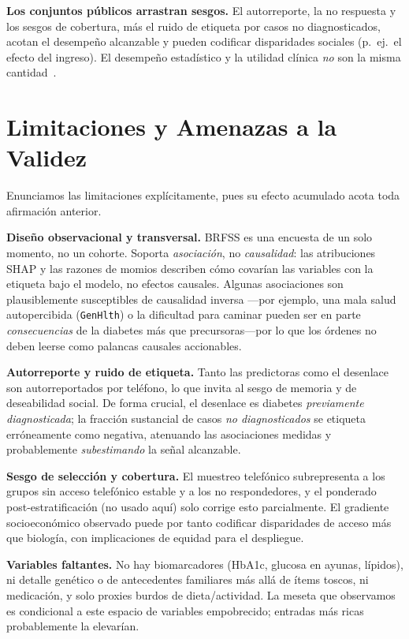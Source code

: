 \documentclass[conference]{IEEEtran}
\begin{document}
\textbf{Los conjuntos públicos arrastran sesgos.} El autorreporte, la no respuesta y los
sesgos de cobertura, más el ruido de etiqueta por casos no diagnosticados, acotan el
desempeño alcanzable y pueden codificar disparidades sociales (p.\ ej.\ el efecto del
ingreso). El desempeño estadístico y la utilidad clínica \emph{no} son la misma
cantidad~\cite{vancalster2019calibration,steyerberg2019validation}.

\section{Limitaciones y Amenazas a la Validez}
Enunciamos las limitaciones explícitamente, pues su efecto acumulado acota toda afirmación
anterior.

\textbf{Diseño observacional y transversal.} BRFSS es una encuesta de un solo momento, no un
cohorte. Soporta \emph{asociación}, no \emph{causalidad}: las atribuciones SHAP y las
razones de momios describen cómo covarían las variables con la etiqueta bajo el modelo, no
efectos causales. Algunas asociaciones son plausiblemente susceptibles de causalidad inversa
---por ejemplo, una mala salud autopercibida (\texttt{GenHlth}) o la dificultad para caminar
pueden ser en parte \emph{consecuencias} de la diabetes más que precursoras---por lo que los
órdenes no deben leerse como palancas causales accionables.

\textbf{Autorreporte y ruido de etiqueta.} Tanto las predictoras como el desenlace son
autorreportados por teléfono, lo que invita al sesgo de memoria y de deseabilidad social. De
forma crucial, el desenlace es diabetes \emph{previamente diagnosticada}; la fracción
sustancial de casos \emph{no diagnosticados} se etiqueta erróneamente como negativa,
atenuando las asociaciones medidas y probablemente \emph{subestimando} la señal alcanzable.

\textbf{Sesgo de selección y cobertura.} El muestreo telefónico subrepresenta a los grupos
sin acceso telefónico estable y a los no respondedores, y el ponderado post-estratificación
(no usado aquí) solo corrige esto parcialmente. El gradiente socioeconómico observado puede
por tanto codificar disparidades de acceso más que biología, con implicaciones de equidad
para el despliegue.

\textbf{Variables faltantes.} No hay biomarcadores (HbA1c, glucosa en ayunas, lípidos), ni
detalle genético o de antecedentes familiares más allá de ítems toscos, ni medicación, y
solo proxies burdos de dieta/actividad. La meseta que observamos es condicional a este
espacio de variables empobrecido; entradas más ricas probablemente la elevarían.
\end{document}
